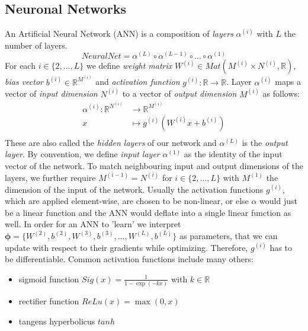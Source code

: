 \documentclass[12pt]{report}
\theoremstyle{definition}
\begin{document}
\subsection{Neuronal Networks}
An Artificial Neural Network (ANN) is a composition of \emph{layers} $\alpha^{(i)}$ with $L$ the number of layers.
\begin{equation}
NeuralNet = \alpha^{(L)} \circ \alpha^{(L-1)} \circ ... \circ \alpha^{(1)}
\end{equation}
For each $i \in \{2, ..., L\} $ we define \emph{weight matrix} $W^{(i)} \in Mat(M^{(i)} \times N^{(i)}, \mathbb{R})$, \emph{bias vector} $b^{(i)} \in \mathbb{R}^{M^{(i)}}$ and \emph{activation function} $g^{(i)}: \mathbb{R} \rightarrow \mathbb{R}$.  Layer $\alpha^{(i)}$ maps a vector of \emph{input dimension} $N^{(i)}$ to a vector of \emph{output dimension} $M^{(i)}$ as follows:
\begin{equation}
\begin{split}
\alpha^{(i)}: \mathbb{R}^{N^{(i)}} & \rightarrow \mathbb{R}^{M^{(i)}} \\
x & \mapsto g^{(i)}(W^{(i)}x+b^{(i)})\\
\end{split}
\end{equation}
These are also called the \emph{hidden layers} of our network and $\alpha^{(L)}$ is the \emph{output layer}. By convention, we define \emph{input layer} $\alpha^{(1)}$ as the identity of the input vector of the network. To match neighbouring input and output dimensions of the layers, we further require $M^{(i-1)} = N^{(i)}$ for $i \in \{2, ..., L\}$ with $M^{(1)}$ the dimension of the input of the network.
Usually the activation functions $g^{(i)}$, which are applied element-wise, are chosen to be non-linear, or else $\alpha$ would just be a linear function and the ANN would deflate into a single linear function as well. 
In order for an ANN to 'learn' we interpret $\pmb{\phi} = \{W^{(2)},  b^{(2)}, W^{(3)},  b^{(3)}, ..., W^{(L)},  b^{(L)}\}$ as parameters, that we can update with respect to their gradients while optimizing. Therefore, $g^{(i)}$ has to be differentiable. Common activation functions include many others:
\begin{itemize}
\item sigmoid function $Sig(x) = \frac{1}{1 - \exp(-kx)}$ with $k \in \mathbb{R}$
\item rectifier function $ReLu(x) = \max(0, x)$ 
\item tangens hyperbolicus $tanh$
\end{itemize} 
\end{document}
